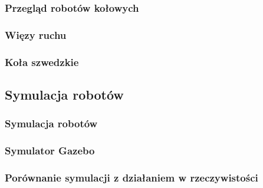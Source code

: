 \begin{frame}
\frametitle{Przegląd robotów kołowych}
\end{frame}


\begin{frame}
\frametitle{Więzy ruchu}

\end{frame}


\begin{frame}
\frametitle{Koła szwedzkie}

\end{frame}


\subsection{Symulacja robotów}

\begin{frame}
\frametitle{Symulacja robotów}

\end{frame}


\begin{frame}
\frametitle{Symulator Gazebo}

\end{frame}


\begin{frame}
\frametitle{Porównanie symulacji z działaniem w rzeczywistości}

\end{frame}

